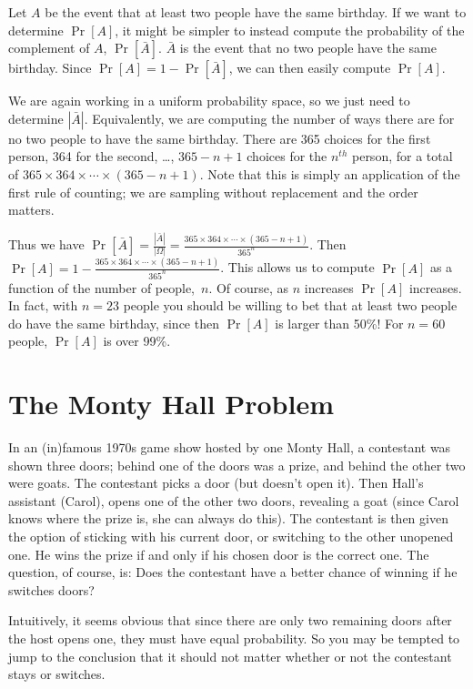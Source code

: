 \documentclass[11pt,fleqn]{article}
\begin{document}
Let $A$ be the event that at least two people have the same birthday. If we want to determine $\Pr[A]$,
it might be simpler to instead compute the probability of the complement of $A$, $\Pr[\bar{A}]$. $\bar{A}$ 
is the event that no two people have the same birthday.
Since $\Pr[A] = 1 - \Pr[\bar{A}]$, we can then easily compute $\Pr[A]$. 

We are again working in a uniform probability space, so we just need to determine $|\bar{A}|$. Equivalently, 
we are computing the number of ways there are for no two people to have the same birthday. There are 
365 choices for the first person,
364 for the second, \ldots, $365-n+1$ choices for the $n^{th}$ person, for a total of
$365 \times 364 \times \cdots \times (365-n+1)$.  Note that this is simply an application of 
the first rule of counting; we are sampling without replacement and 
the order matters. 

Thus we have $\Pr[{\bar A}] = \frac{|{\bar A}|}{|\Omega|} =
\frac{365 \times 364 \times \cdots \times (365-n+1)}{365^n}$. Then
$\Pr[A] = 1 - \frac{365 \times 364 \times \cdots \times (365-n+1)}{365^n}$.  This allows
us to compute $\Pr[A]$ as a function of the number of people,~$n$.  Of course, as $n$ increases
$\Pr[A]$ increases.  In fact, with $n=23$ people you should be willing to bet that at least
two people do have the same birthday, since then $\Pr[A]$ is larger than 50\%! For $n=60$
people, $\Pr[A]$ is over 99\%.

\section*{The Monty Hall Problem}

In an (in)famous 1970s game show hosted by one Monty Hall, a
contestant was shown three doors; behind one of the doors was a
prize, and behind the other two were goats.  The contestant picks
a door (but doesn't open it). Then Hall's assistant (Carol),
opens one of the other two doors, revealing a goat (since
Carol knows where the prize is, she can always do this).
The contestant is then given the option
of sticking with his current door, or switching to the other unopened one.
He wins the prize if and only if his chosen door is the correct one.
The question, of course, is: Does the contestant have a better chance
of winning if he switches doors?

Intuitively, it seems obvious that since there are only two remaining
doors after the host opens one, they must have equal probability. So
you may be tempted to jump to the conclusion that it should not matter
whether or not the contestant stays or switches. 
\end{document}
